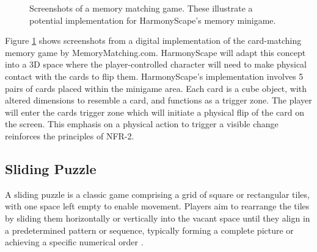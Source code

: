\documentclass{l4proj}
\begin{document}
\begin{figure}[h]
  \caption{Screenshots of a memory matching game. These illustrate a potential implementation for HarmonyScape's memory minigame.} 
  \label{fig:mem_match}
\end{figure}

Figure \ref{fig:mem_match} shows screenshots from a digital implementation of the card-matching memory game by MemoryMatching.com. HarmonyScape will adapt this concept into a 3D space where the player-controlled character will need to make physical contact with the cards to flip them. HarmonyScape's implementation involves 5 pairs of cards placed within the minigame area. Each card is a cube object, with altered dimensions to resemble a card, and functions as a trigger zone. The player will enter the cards trigger zone which will initiate a physical flip of the card on the screen. This emphasis on a physical action to trigger a visible change reinforces the principles of NFR-2.

\subsection{Sliding Puzzle}
A sliding puzzle is a classic game comprising a grid of square or rectangular tiles, with one space left empty to enable movement. Players aim to rearrange the tiles by sliding them horizontally or vertically into the vacant space until they align in a predetermined pattern or sequence, typically forming a complete picture or achieving a specific numerical order \citep{hearn2005complexity}.
\end{document}
